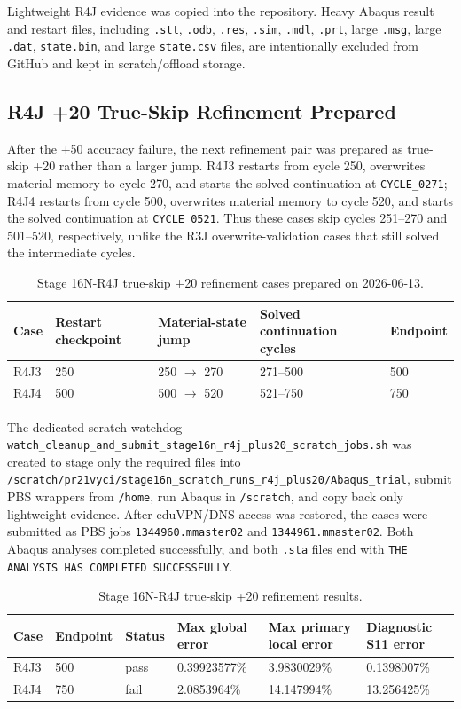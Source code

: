 \documentclass[11pt,a4paper]{article}
\newcommand{\code}[1]{\texttt{#1}}
\begin{document}
Lightweight R4J evidence was copied into the repository. Heavy Abaqus result and restart files, including \code{.stt}, \code{.odb}, \code{.res}, \code{.sim}, \code{.mdl}, \code{.prt}, large \code{.msg}, large \code{.dat}, \code{state.bin}, and large \code{state.csv} files, are intentionally excluded from GitHub and kept in scratch/offload storage.

\subsection{R4J +20 True-Skip Refinement Prepared}

After the +50 accuracy failure, the next refinement pair was prepared as true-skip +20 rather than a larger jump. R4J3 restarts from cycle 250, overwrites material memory to cycle 270, and starts the solved continuation at \code{CYCLE\_0271}; R4J4 restarts from cycle 500, overwrites material memory to cycle 520, and starts the solved continuation at \code{CYCLE\_0521}. Thus these cases skip cycles 251--270 and 501--520, respectively, unlike the R3J overwrite-validation cases that still solved the intermediate cycles.

\begin{table}[H]
\centering
\caption{Stage 16N-R4J true-skip +20 refinement cases prepared on 2026-06-13.}
\begin{tabular}{lllll}
\toprule
Case & Restart checkpoint & Material-state jump & Solved continuation cycles & Endpoint \\
\midrule
R4J3 & 250 & 250 $\rightarrow$ 270 & 271--500 & 500 \\
R4J4 & 500 & 500 $\rightarrow$ 520 & 521--750 & 750 \\
\bottomrule
\end{tabular}
\end{table}

The dedicated scratch watchdog \code{watch\_cleanup\_and\_submit\_stage16n\_r4j\_plus20\_scratch\_jobs.sh} was created to stage only the required files into \code{/scratch/pr21vyci/stage16n\_scratch\_runs\_r4j\_plus20/Abaqus\_trial}, submit PBS wrappers from \code{/home}, run Abaqus in \code{/scratch}, and copy back only lightweight evidence. After eduVPN/DNS access was restored, the cases were submitted as PBS jobs \code{1344960.mmaster02} and \code{1344961.mmaster02}. Both Abaqus analyses completed successfully, and both \code{.sta} files end with \code{THE ANALYSIS HAS COMPLETED SUCCESSFULLY}.

\begin{table}[H]
\centering
\caption{Stage 16N-R4J true-skip +20 refinement results.}
\begin{tabular}{llllll}
\toprule
Case & Endpoint & Status & Max global error & Max primary local error & Diagnostic S11 error \\
\midrule
R4J3 & 500 & pass & 0.39923577\% & 3.9830029\% & 0.1398007\% \\
R4J4 & 750 & fail & 2.0853964\% & 14.147994\% & 13.256425\% \\
\bottomrule
\end{tabular}
\end{table}
\end{document}
